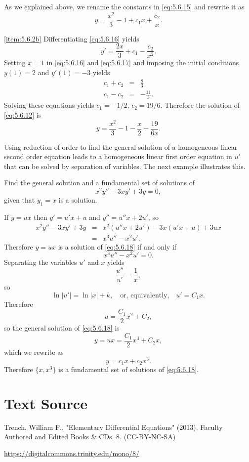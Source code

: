 \documentclass{ximera}
\begin{document}
\begin{example}
\begin{explanation}
As we explained above, we rename the constants in \eqref{eq:5.6.15} and
rewrite it as
\begin{equation}  \label{eq:5.6.16}
y=\frac{x^2}{3}-1+c_1x+\frac{c_2}{x}.
\end{equation}
 
\ref{item:5.6.2b}   Differentiating  \eqref{eq:5.6.16} yields
\begin{equation} \label{eq:5.6.17}
y'=\frac{2x}{3}+c_1-\frac{c_2}{x^2}.
\end{equation}
 Setting $x=1$ in  \eqref{eq:5.6.16} and  \eqref{eq:5.6.17} and imposing the
initial conditions $y(1)=2$ and $y'(1)=-3$  yields
\begin{eqnarray*}
c_1+c_2&=& \frac{8}{3} \\
c_1-c_2&=& -\frac{11}{3}.
\end{eqnarray*}
Solving these  equations yields $c_1=-1/2$, $c_2=19/6$.
Therefore the solution of \eqref{eq:5.6.12} is
$$
y=\frac{x^2}{3}-1-\frac{x}{2}+\frac{19}{6x}.
$$
\end{explanation}
\end{example}
 
 
Using reduction of order to  find the general solution of
a homogeneous linear second order  equation leads to a
homogeneous linear first  order  equation in $u'$ that can be solved
by separation of variables. The next example illustrates this.
 
\begin{example}\label{example:5.6.3}
 Find the general solution and a fundamental set  of solutions of
\begin{equation}  \label{eq:5.6.18}
x^2y''-3xy'+3y=0,
\end{equation}
 given that $y_1=x$ is a solution.
 
 
\begin{explanation}
 If $y=ux$ then $y'=u'x+u$ and $y''=u''x+2u'$, so
\begin{eqnarray*}
x^2y''-3xy'+3y&=&x^2(u''x+2u')-3x(u'x+u)+3ux\\
&=&x^3u''-x^2u'.
\end{eqnarray*}
Therefore $y=ux$ is a solution of \eqref{eq:5.6.18} if and only if
$$
x^3u''-x^2u'=0.
$$
Separating the variables $u'$ and $x$ yields
$$
\frac{u''}{u'}=\frac{1}{x},
$$
so
$$
\ln|u'|=\ln|x|+k,\quad\mbox{or, equivalently,}\quad u'=C_1x.
$$
Therefore
$$
u=\frac{C_1}{2}x^2+C_2,
$$
so the general solution of \eqref{eq:5.6.18} is
$$
y=ux=\frac{C_1}{2}x^3+C_2x,
$$
which we rewrite as
$$
y=c_1x+c_2x^3.
$$
Therefore $\{x,x^3\}$ is  a fundamental set of solutions of
\eqref{eq:5.6.18}.
\end{explanation}
\end{example}
 
 
\section*{Text Source}
Trench, William F., "Elementary Differential Equations" (2013). Faculty Authored and Edited Books \& CDs. 8. (CC-BY-NC-SA)
 
\href{https://digitalcommons.trinity.edu/mono/8/}{https://digitalcommons.trinity.edu/mono/8/}
 
\end{document}
